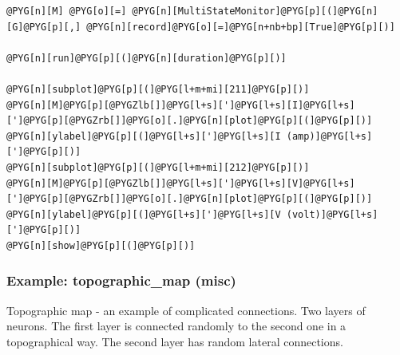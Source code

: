 \documentclass[letterpaper,10pt,english]{manual}
\begin{document}
\begin{Verbatim}[commandchars=@\[\]]
@PYG[n][M] @PYG[o][=] @PYG[n][MultiStateMonitor]@PYG[p][(]@PYG[n][G]@PYG[p][,] @PYG[n][record]@PYG[o][=]@PYG[n+nb+bp][True]@PYG[p][)]

@PYG[n][run]@PYG[p][(]@PYG[n][duration]@PYG[p][)]

@PYG[n][subplot]@PYG[p][(]@PYG[l+m+mi][211]@PYG[p][)]
@PYG[n][M]@PYG[p][@PYGZlb[]]@PYG[l+s][']@PYG[l+s][I]@PYG[l+s][']@PYG[p][@PYGZrb[]]@PYG[o][.]@PYG[n][plot]@PYG[p][(]@PYG[p][)]
@PYG[n][ylabel]@PYG[p][(]@PYG[l+s][']@PYG[l+s][I (amp)]@PYG[l+s][']@PYG[p][)]
@PYG[n][subplot]@PYG[p][(]@PYG[l+m+mi][212]@PYG[p][)]
@PYG[n][M]@PYG[p][@PYGZlb[]]@PYG[l+s][']@PYG[l+s][V]@PYG[l+s][']@PYG[p][@PYGZrb[]]@PYG[o][.]@PYG[n][plot]@PYG[p][(]@PYG[p][)]
@PYG[n][ylabel]@PYG[p][(]@PYG[l+s][']@PYG[l+s][V (volt)]@PYG[l+s][']@PYG[p][)]
@PYG[n][show]@PYG[p][(]@PYG[p][)]
\end{Verbatim}

\resetcurrentobjects
\hypertarget{--doc-examples-misc_topographic_map}{}

\hypertarget{index-69}{}\subsubsection{Example: topographic\_map (misc)}

Topographic map - an example of complicated connections.
Two layers of neurons.
The first layer is connected randomly to the second one in a
topographical way.
The second layer has random lateral connections.
\end{document}
